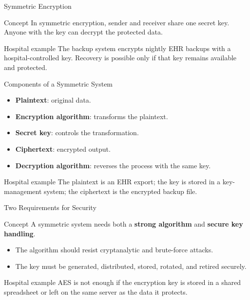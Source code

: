 \documentclass[presentation]{beamer}
\begin{document}
\begin{frame}[c]{Symmetric Encryption}
\begin{block}{Concept}
In symmetric encryption, sender and receiver share one secret key. Anyone with the key can decrypt
the protected data.
\end{block}

\begin{exampleblock}{Hospital example}
The backup system encrypts nightly EHR backups with a hospital-controlled key. Recovery is
possible only if that key remains available and protected.
\end{exampleblock}
\end{frame}

\begin{frame}[c]{Components of a Symmetric System}
\begin{itemize}
    \item \textbf{Plaintext}: original data.
    \item \textbf{Encryption algorithm}: transforms the plaintext.
    \item \textbf{Secret key}: controls the transformation.
    \item \textbf{Ciphertext}: encrypted output.
    \item \textbf{Decryption algorithm}: reverses the process with the same key.
\end{itemize}

\begin{exampleblock}{Hospital example}
The plaintext is an EHR export; the key is stored in a key-management system; the ciphertext is
the encrypted backup file.
\end{exampleblock}
\end{frame}

\begin{frame}[c]{Two Requirements for Security}
\begin{block}{Concept}
A symmetric system needs both a \textbf{strong algorithm} and \textbf{secure key handling}.
\end{block}

\begin{itemize}
    \item The algorithm should resist cryptanalytic and brute-force attacks.
    \item The key must be generated, distributed, stored, rotated, and retired securely.
\end{itemize}

\begin{exampleblock}{Hospital example}
AES is not enough if the encryption key is stored in a shared spreadsheet or left on the same
server as the data it protects.
\end{exampleblock}
\end{frame}
\end{document}
